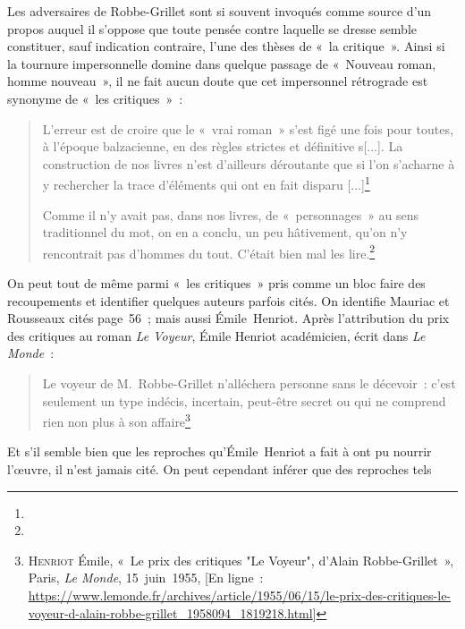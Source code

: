 \documentclass[12pt, a4paper]{article}
\begin{document}
Les adversaires de Robbe-Grillet sont si souvent invoqués comme source d'un propos auquel il s'oppose que toute pensée contre laquelle se dresse \robbe{} semble constituer, sauf indication contraire, l'une des thèses de «~la critique~». Ainsi si la tournure impersonnelle domine dans quelque passage de «~Nouveau roman, homme nouveau~», il ne fait aucun doute que cet impersonnel rétrograde est synonyme de «~les critiques~»~:
\begin{quote}
    L'erreur est de croire que le «~vrai roman~» s’est figé une fois pour toutes, à l’époque balzacienne, en des règles strictes et définitive s[...]. La construction de nos livres n’est d’ailleurs déroutante que si l’on s’acharne à y rechercher la trace d’éléments qui ont en fait disparu [...]\footnote{}

    Comme il n’y avait pas, dans nos livres, de «~personnages~» au sens traditionnel du mot, on en a conclu, un peu hâtivement, qu’on n’y rencontrait pas d’hommes du tout. C’était bien mal les lire.\footnote{}
\end{quote}

On peut tout de même parmi «~les critiques~» pris comme un bloc faire des recoupements et identifier quelques auteurs parfois cités.
On identifie Mauriac et Rousseaux cités page~56~; mais aussi Émile~Henriot. Après l'attribution du prix des critiques au roman \textit{Le Voyeur}, Émile Henriot académicien, écrit dans \textit{Le Monde}~:
\begin{quote}
    Le voyeur de M.~Robbe-Grillet n'alléchera personne sans le décevoir~: c'est seulement un type indécis, incertain, peut-être secret ou qui ne comprend rien non plus à son affaire\footnote{\textsc{Henriot} Émile, «~Le prix des critiques "Le Voyeur", d'Alain Robbe-Grillet~», Paris, \textit{Le Monde}, 15~juin~1955, [En ligne~: \href{https://www.lemonde.fr/archives/article/1955/06/15/le-prix-des-critiques-le-voyeur-d-alain-robbe-grillet_1958094_1819218.html}{https://www.lemonde.fr/archives/article/1955/06/15/le-prix-des-critiques-le-voyeur-d-alain-robbe-grillet\_1958094\_1819218.html}]}
\end{quote}
Et s'il semble bien que les reproches qu'Émile~Henriot a fait à \robbe{} ont pu nourrir l'œuvre, il n'est jamais cité. On peut cependant inférer que des reproches tels
\end{document}
